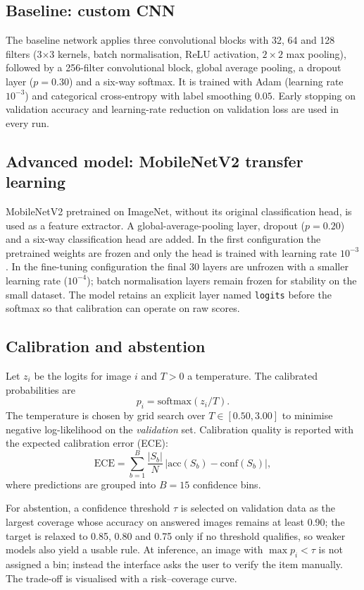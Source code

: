 \documentclass[11pt,a4paper]{article}
\begin{document}
\subsection{Baseline: custom CNN}
The baseline network applies three convolutional blocks with 32, 64 and 128 filters
(3$\times$3 kernels, batch normalisation, ReLU activation, $2\times2$ max pooling), followed
by a 256-filter convolutional block, global average pooling, a dropout layer ($p=0.30$)
and a six-way softmax. It is trained with Adam (learning rate $10^{-3}$) and categorical
cross-entropy with label smoothing $0.05$. Early stopping on validation accuracy and
learning-rate reduction on validation loss are used in every run.

\subsection{Advanced model: MobileNetV2 transfer learning}
MobileNetV2 pretrained on ImageNet, without its original classification head, is used as a
feature extractor. A global-average-pooling layer, dropout ($p=0.20$) and a six-way
classification head are added. In the first configuration the pretrained weights are frozen
and only the head is trained with learning rate $10^{-3}$. In the fine-tuning configuration
the final 30 layers are unfrozen with a smaller learning rate ($10^{-4}$); batch
normalisation layers remain frozen for stability on the small dataset. The model retains an
explicit layer named \texttt{logits} before the softmax so that calibration can operate on
raw scores.

\subsection{Calibration and abstention}
Let $z_i$ be the logits for image $i$ and $T>0$ a temperature. The calibrated probabilities
are
\begin{equation}
  p_i = \mathrm{softmax}(z_i / T).
\end{equation}
The temperature is chosen by grid search over $T\in[0.50,3.00]$ to minimise negative
log-likelihood on the \emph{validation} set. Calibration quality is reported with the
expected calibration error (ECE):
\begin{equation}
  \mathrm{ECE} = \sum_{b=1}^{B}\frac{|S_b|}{N}\,\left|\mathrm{acc}(S_b)-\mathrm{conf}(S_b)\right|,
\end{equation}
where predictions are grouped into $B=15$ confidence bins.

For abstention, a confidence threshold $\tau$ is selected on validation data as the
largest coverage whose accuracy on answered images remains at least 0.90; the target is
relaxed to 0.85, 0.80 and 0.75 only if no threshold qualifies, so weaker models also yield
a usable rule. At inference, an image with $\max p_i < \tau$ is not assigned a bin; instead
the interface asks the user to verify the item manually. The trade-off is visualised with a
risk--coverage curve.
\end{document}
